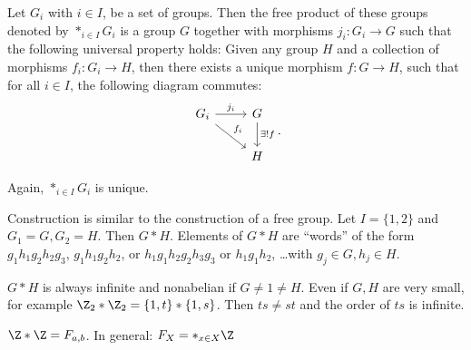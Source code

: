 \begin{definition}
    Let $G_i$ with  $i \in I$, be a set of groups.
    Then the free product of  these groups denoted by $*_{i \in I}G_i$ is a group $G$ together with morphisms $j_i: G_i \to  G$ such that the following universal property holds:
    Given any group $H$ and a collection of morphisms $f_i: G_i \to H$, then there exists a unique morphism $f: G \to  H$, such that for all $i \in I$, the following diagram commutes:
    \[
    \begin{tikzcd}
        G_i \arrow[r, "j_i"] \arrow[dr, "f_i"] & G \arrow[d, "\exists! f"]\\
                                               & H
    \end{tikzcd}
    .\] 
\end{definition}
\begin{note}
    Again, $*_{i \in I} G_i$ is unique.
\end{note}
\begin{eg}
    Construction is similar to the construction of a free group.
    Let $I = \{1, 2\}$ and $G_1 =G, G_2 = H$.
    Then $G*H$.
    Elements of $G*H$ are ``words'' of the form $g_1h_1g_2h_2g_3$, $g_1 h_1g_2h_2$, or $h_1 g_1h_2g_2h_3g_3$ or $h_1g_1h_2$, \ldots with $g_j\in G, h_j \in H$.
\end{eg}
\begin{note}
    $G*H$ is always infinite and nonabelian if $G \neq 1 \neq H$.
    Even if $G, H$ are very small, for example $\Z_2 * \Z_2 = \{1, t\} * \{1, s\}$. Then $ts \neq st$ and the order of $ts$ is infinite.
\end{note}

\begin{note}
    $\Z * \Z = F_{a, b}$. In general: $F_X = *_{x \in X} \Z$
\end{note}

\setcounter{section}{69}
